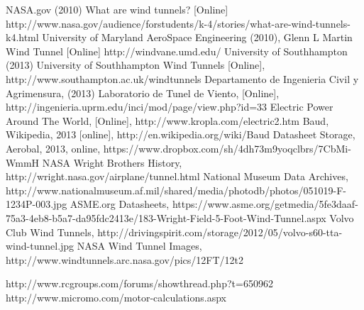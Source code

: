 \begin{thebibliography}{99}
		NASA.gov (2010) What are wind tunnels? [Online] http://www.nasa.gov/audience/forstudents/k-4/stories/what-are-wind-tunnels-k4.html
		University of Maryland AeroSpace Engineering (2010), Glenn L Martin Wind Tunnel [Online] http://windvane.umd.edu/
		University of Southhampton (2013) University of Southhampton Wind Tunnels [Online], http://www.southampton.ac.uk/windtunnels
		Departamento de Ingenieria Civil y Agrimensura, (2013) Laboratorio de Tunel de Viento, [Online], http://ingenieria.uprm.edu/inci/mod/page/view.php?id=33
		Electric Power Around The World, [Online], http://www.kropla.com/electric2.htm
			Baud, Wikipedia, 2013 [online], http://en.wikipedia.org/wiki/Baud
			Datasheet Storage, Aerobal, 2013, online, https://www.dropbox.com/sh/4dh73m9yoqclbrs/7CbMi-WmmH
			NASA Wright Brothers History, http://wright.nasa.gov/airplane/tunnel.html
			National Museum Data Archives, http://www.nationalmuseum.af.mil/shared/media/photodb/photos/051019-F-1234P-003.jpg
			ASME.org Datasheets, https://www.asme.org/getmedia/5fe3daaf-75a3-4eb8-b5a7-da95fdc2413e/183-Wright-Field-5-Foot-Wind-Tunnel.aspx
			Volvo Club Wind Tunnels, http://drivingspirit.com/storage/2012/05/volvo-s60-tta-wind-tunnel.jpg
		   NASA Wind Tunnel Images, http://www.windtunnels.arc.nasa.gov/pics/12FT/12t2
			
	 http://www.rcgroups.com/forums/showthread.php?t=650962
	 http://www.micromo.com/motor-calculations.aspx
			
\end{thebibliography}